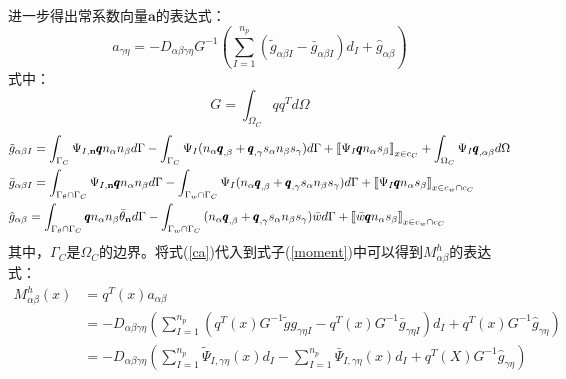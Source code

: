 \documentclass[a4paper]{article}
\begin{document}
进一步得出常系数向量$\pmb{a}$的表达式：
\begin{equation}\label{ca}
    a_{\gamma\eta}=-D_{\alpha\beta\gamma\eta}G^{-1}(\sum_{I=1}^{n_p}(\tilde{g}_{\alpha\beta I}-\bar{g}_{\alpha\beta I})d_I+\hat{g}_{\alpha\beta})
\end{equation}
式中：
\begin{equation}
    G=\int_{\Omega_C}{q}{q}^Td\Omega
\end{equation}
\begin{equation}
\begin{split}
    &{\tilde g}_{\alpha\beta I} = \int_{{\Gamma _C}}^{}{{\Psi _{I,{\bf{n}}}}{\pmb{q}}{n_\alpha }{n_\beta }d\Gamma }-\int_{{\Gamma _C}}^{}{{\Psi _I}({n_\alpha }{{\pmb{q}}_{,\beta }} + {{\pmb{q}}_{,\gamma }}{s_\alpha}{n_\beta }{s_\gamma})d\Gamma }  + {\left[\kern-0.15em\left[ {{\Psi _I}{\pmb{q}}{n_\alpha }{s_\beta }} 
     \right]\kern-0.15em\right]_{{{x}} \in {c_C}}} + \int_{{\Omega _C}}^{} {{\Psi _I}{{\pmb{q}}_{,\alpha \beta }}d\Omega } \\
    &{\bar g}_{\alpha \beta I} = \int_{{\Gamma _\theta } \cap {\Gamma _C}}^{} {{\Psi _{I,{\bf{n}}}}{\pmb{q}}{n_\alpha }{n_\beta }d\Gamma }  - \int_{{\Gamma _w} \cap {\Gamma _C}}^{} {{\Psi _I}({n_\alpha }{{\pmb{q}}_{,\beta }} + {{\pmb{q}}_{,\gamma }}{s_\alpha }{n_\beta }{s_\gamma })d\Gamma }  + {\left[\kern-0.15em\left[ {{\Psi _I}{\pmb{q}}{n_\alpha }{s_\beta }} 
     \right]\kern-0.15em\right]_{{{x}} \in {c_w} \cap {c_C}}}\\
    &\hat{g}_{\alpha \beta }= \int_{{\Gamma _\theta } \cap {\Gamma _C}}^{} {{\pmb{q}}{n_\alpha }{n_\beta }{{\bar \theta }_{\bf{n}}}d\Gamma }  - \int_{{\Gamma _w} \cap {\Gamma _C}}^{} {({n_\alpha }{{\pmb{q}}_{,\beta }} + {{\pmb{q}}_{,\gamma }}{s_\alpha }{n_\beta }{s_\gamma })\bar wd\Gamma }  + {\left[\kern-0.15em\left[ {\bar w{\pmb{q}}{n_\alpha }{s_\beta }} 
     \right]\kern-0.15em\right]_{{{x}} \in {c_w} \cap {c_C}}}
\end{split}
\end{equation}
其中，$\Gamma_C$是$\Omega_C$的边界。将式(\ref{ca})代入到式子(\ref{moment})中可以得到${M}^h_{\alpha\beta}$的表达式：
\begin{equation}
\begin{split}
M_{\alpha\beta}^h(x)&=q^T(x)a_{\alpha\beta}\\
&=-D_{\alpha\beta\gamma\eta}(\sum_{I=1}^{n_p}(q^T(x)G^{-1}\tilde{g}g_{\gamma\eta I}-q^T(x)G^{-1}\bar{g}_{\gamma\eta I})d_I+q^T(x)G^{-1}\hat{g}_{\gamma\eta})\\
&=-D_{\alpha\beta\gamma\eta}(\sum_{I=1}^{n_p}\tilde{\Psi}_{I,\gamma\eta}(x)d_I-\sum_{I=1}^{n_p}\bar{\Psi}_{I,\gamma\eta}(x)d_I+q^T(X)G^{-1}\hat{g}_{\gamma\eta})
\end{split}
\end{equation}
\end{document}
